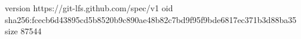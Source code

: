 version https://git-lfs.github.com/spec/v1
oid sha256:fcecb6d43895cd5b8520b9c890ae48b82c7bd9f95f9bde6817ec371b3d88ba35
size 87544
